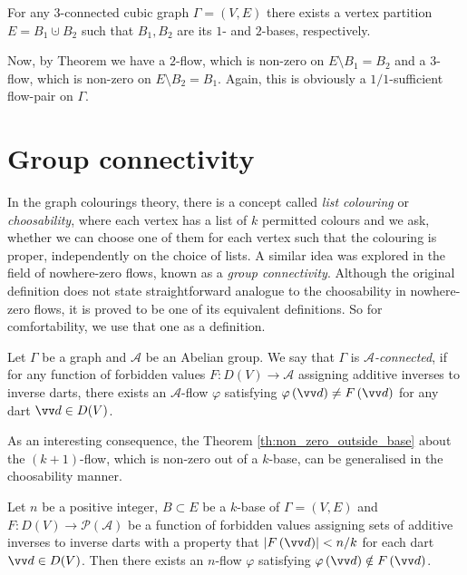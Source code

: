 \begin{lemma} \emph{\cite[p. 134]{seymour}}
	For any $3$-connected cubic graph $\Gamma=(V,E)$ there exists a vertex partition $E=B_1\cupdot B_2$ such that $B_1,B_2$ are its $1$- and $2$-bases, respectively.
\end{lemma}

Now, by Theorem \label{th:non_zero_outside_base} we have a $2$-flow, which is non-zero on $E\setminus B_1 = B_2$ and a $3$-flow, which is non-zero on $E\setminus B_2=B_1$. Again, this is obviously a $1/1$-sufficient flow-pair on $\Gamma$.

\section{Group connectivity}

In the graph colourings theory, there is a concept called \emph{list colouring} or \emph{choosability}, where each vertex has a list of $k$ permitted colours and we ask, whether we can choose one of them for each vertex such that the colouring is proper, independently on the choice of lists. A similar idea was explored in the field of nowhere-zero flows, known as a \emph{group connectivity}. Although the original definition does not state straightforward analogue to the choosability in nowhere-zero flows, it is proved to be one of its equivalent definitions. So for comfortability, we use that one as a definition.

\begin{definition} \cite[p. 167]{group_connectivity}
	Let $\Gamma$ be a graph and $\mathcal A$ be an Abelian group. We say that $\Gamma$ is \emph{$\mathcal A$-connected}, if for any function of forbidden values $F\colon D(V)\to \mathcal A$ assigning additive inverses to inverse darts, there exists an $\mathcal A$-flow $\varphi$ satisfying $\varphi\left(\vv d\right)\neq F\left(\vv d\right)$ for any dart $\vv d\in D(V)$.
\end{definition}

As an interesting consequence, the Theorem \ref{th:non_zero_outside_base} about the $(k+1)$-flow, which is non-zero out of a $k$-base, can be generalised in the choosability manner.

\begin{theorem} \emph{\cite[p. 168]{group_connectivity}}
	Let $n$ be a positive integer, $B\subset E$ be a $k$-base of $\Gamma=(V,E)$ and $F\colon D(V)\to \mathcal P(\mathcal A)$ be a function of forbidden values assigning sets of additive inverses to inverse darts with a property that $\left|F\left(\vv d\right)\right| < n/k$ for each dart $\vv d\in D(V)$. Then there exists an $n$-flow $\varphi$ satisfying $\varphi\left(\vv d\right)\notin F\left(\vv d\right)$.
\end{theorem}


